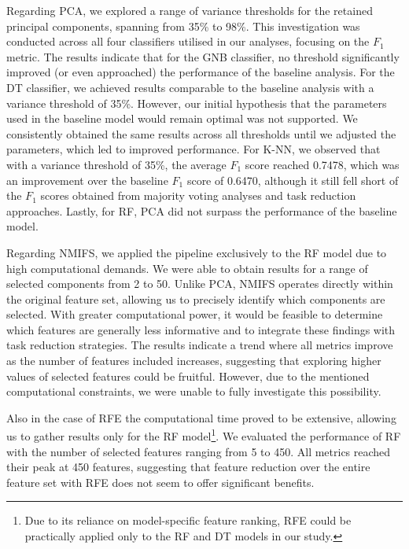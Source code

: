 \documentclass[a4paper, 11pt]{article}
\begin{document}
Regarding PCA, we explored a range of variance thresholds for the retained principal components, spanning from 35\% to 98\%. This investigation was conducted across all four classifiers utilised in our analyses, focusing on the $F_1$ metric. The results indicate that for the GNB classifier, no threshold significantly improved (or even approached) the performance of the baseline analysis. For the DT classifier, we achieved results comparable to the baseline analysis with a variance threshold of 35\%. However, our initial hypothesis that the parameters used in the baseline model would remain optimal was not supported. We consistently obtained the same results across all thresholds until we adjusted the parameters, which led to improved performance. For K-NN, we observed that with a variance threshold of 35\%, the average $F_1$ score reached 0.7478, which was an improvement over the baseline $F_1$ score of 0.6470, although it still fell short of the $F_1$ scores obtained from majority voting analyses and task reduction approaches. Lastly, for RF, PCA did not surpass the performance of the baseline model.

Regarding NMIFS, we applied the pipeline exclusively to the RF model due to high computational demands. We were able to obtain results for a range of selected components from 2 to 50. Unlike PCA, NMIFS operates directly within the original feature set, allowing us to precisely identify which components are selected. With greater computational power, it would be feasible to determine which features are generally less informative and to integrate these findings with task reduction strategies. The results indicate a trend where all metrics improve as the number of features included increases, suggesting that exploring higher values of  selected features could be fruitful. However, due to the mentioned computational constraints, we were unable to fully investigate this possibility.

Also in the case of RFE the computational time proved to be extensive, allowing us to gather results only for the RF model\footnote{Due to its reliance on model-specific feature ranking, RFE could be practically applied only to the RF and DT models in our study.}. We evaluated the performance of RF with the number of selected features ranging from 5 to 450. All metrics reached their peak at 450 features, suggesting that feature reduction over the entire feature set with RFE does not seem to offer significant benefits.
\end{document}
